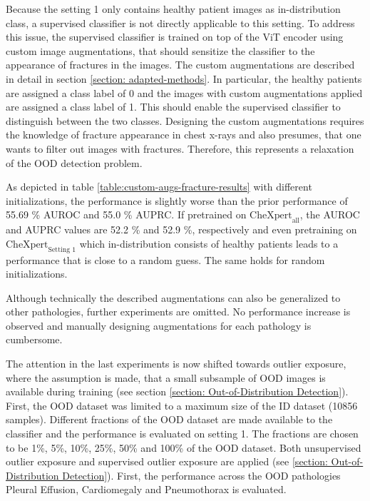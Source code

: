 Because the setting 1 only contains healthy patient images as in-distribution class, a supervised classifier is not directly applicable to this setting.
To address this issue, the supervised classifier is trained on top of the ViT encoder using custom image augmentations, that should sensitize the classifier to the appearance of fractures in the images.
The custom augmentations are described in detail in section \ref{section: adapted-methods}.
In particular, the healthy patients are assigned a class label of 0 and the images with custom augmentations applied are assigned a class label of 1.
This should enable the supervised classifier to distinguish between the two classes.
Designing the custom augmentations requires the knowledge of fracture appearance in chest x-rays and also presumes, that one wants to filter out images with fractures.
Therefore, this represents a relaxation of the OOD detection problem.
\par
As depicted in table \ref{table:custom-augs-fracture-results} with different initializations, the performance is slightly worse than the prior performance of 55.69 \% AUROC  and 55.0 \% AUPRC.
If pretrained on $\text{CheXpert}_\text{all}$, the AUROC and AUPRC values are 52.2 \% and 52.9 \%, respectively and even pretraining on $\text{CheXpert}_\text{Setting 1}$ which in-distribution consists of healthy patients leads to a performance that is close to a random guess.
The same holds for random initializations.
\par
Although technically the described augmentations can also be generalized to other pathologies, further experiments are omitted.
No performance increase is observed and manually designing augmentations for each pathology is cumbersome.
\par
{}
The attention in the last experiments is now shifted towards outlier exposure, where the assumption is made, that a small subsample of OOD images is available during training (see section \ref{section: Out-of-Distribution Detection}).
First, the OOD dataset was limited to a maximum size of the ID dataset (10856 samples).
Different fractions of the OOD dataset are made available to the classifier and the performance is evaluated on setting 1.
The fractions are chosen to be 1\%, 5\%, 10\%, 25\%, 50\% and 100\% of the OOD dataset.
Both unsupervised outlier exposure and supervised outlier exposure are applied (see \ref{section: Out-of-Distribution Detection}).
First, the performance across the OOD pathologies Pleural Effusion, Cardiomegaly and Pneumothorax is evaluated.
